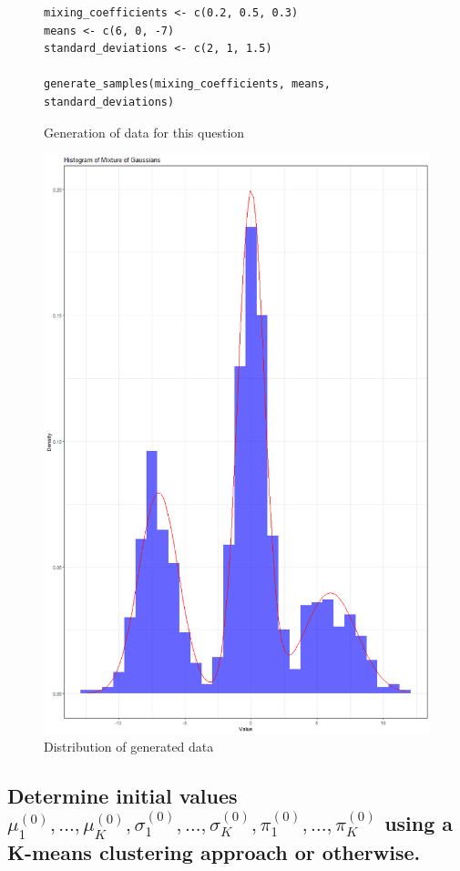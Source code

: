 \documentclass[]{article}
\begin{document}
\begin{figure}[H]
	\captionsetup{type=lstlisting}
	\begin{lstlisting}
mixing_coefficients <- c(0.2, 0.5, 0.3)
means <- c(6, 0, -7)
standard_deviations <- c(2, 1, 1.5)

generate_samples(mixing_coefficients, means, standard_deviations)			
		\end{lstlisting}
	\caption{Generation of data for this question}
	\label{lst:gem-gausmix}
\end{figure}

\begin{figure}[H]
	\centering
	\includegraphics[width=0.5\linewidth]{img/img-5-1}
	\caption{Distribution of generated data}
	\label{fig:img-5-1}
\end{figure}


\subsection{Determine initial values $\mu_1^{(0)}, \dots, \mu_K^{(0)}, \sigma_1^{(0)}, \dots, \sigma_K^{(0)}, \pi_1^{(0)}, \dots, \pi_K^{(0)}$ 	using a K-means clustering approach or otherwise.
}
\end{document}
